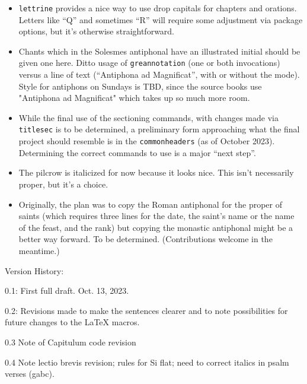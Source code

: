 \documentclass[11pt]{article}
\begin{document}
\begin{itemize}
\item
\verb|lettrine| provides a nice way to use drop capitals for chapters and orations. Letters like ``Q'' and sometimes ``R'' will require some adjustment via package options, but it's otherwise straightforward.
\item
Chants which in the Solesmes antiphonal have an illustrated initial should be given one here. Ditto usage of \verb|greannotation| (one or both invocations) versus a line of text (``Antiphona ad Magnificat'', with or without the mode). Style for antiphons on Sundays is TBD, since the source books use "Antiphona ad Magnificat" which takes up so much more room.
\item While the final use of the sectioning commands, with changes made via \verb|titlesec| is  to be determined, a preliminary form approaching what the final project should resemble is in the \verb|commonheaders| (as of October 2023). Determining the correct commands to use is a major ``next step''.
\item
The pilcrow is italicized for now because it looks nice. This isn't necessarily proper, but it's a choice.
\item
Originally, the plan was to copy the Roman antiphonal for the proper of saints (which requires three lines for the date, the saint's name or the name of the feast, and the rank) but copying the monastic antiphonal might be a better way forward. To be determined. (Contributions welcome in the meantime.)

\end{itemize}

Version History:

0.1: First full draft. Oct. 13, 2023.

0.2: Revisions made to make the sentences clearer and to note possibilities for future changes to the LaTeX macros.

0.3 Note of Capitulum code revision

0.4 Note lectio brevis revision; rules for Si flat; need to correct italics in psalm verses (gabc).
\end{document}

